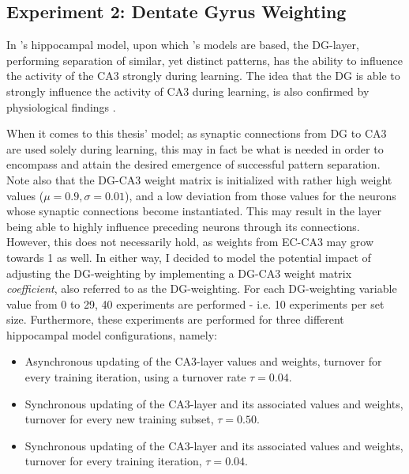 \subsection{Experiment 2: Dentate Gyrus Weighting}

In \citeauthor{Wakagi2008}'s \citeyear{Wakagi2008} hippocampal model, upon which \citeauthor{Hattori2010}'s \citeyear{Hattori2010, Hattori2014} models are based, the DG-layer, performing separation of similar, yet distinct patterns, has the ability to influence the activity of the CA3 strongly during learning. The idea that the DG is able to strongly influence the activity of CA3 during learning, is also confirmed by physiological findings \citep{Rolls1998chpt6}. 

When it comes to this thesis' model; as synaptic connections from DG to CA3 are used solely during learning, this may in fact be what is needed in order to encompass and attain the desired emergence of successful pattern separation. Note also that the DG-CA3 weight matrix is initialized with rather high weight values ($\mu=0.9, \sigma=0.01$), and a low deviation from those values for the neurons whose synaptic connections become instantiated. This may result in the layer being able to highly influence preceding neurons through its connections. However, this does not necessarily hold, as weights from EC-CA3 may grow towards 1 as well. In either way, I decided to model the potential impact of adjusting the DG-weighting by implementing a DG-CA3 weight matrix \textit{coefficient}, also referred to as the DG-weighting. For each DG-weighting variable value from 0 to 29, 40 experiments are performed - i.e. 10 experiments per set size. Furthermore, these experiments are performed for three different hippocampal model configurations, namely:

\begin{itemize}  
\item Asynchronous updating of the CA3-layer values and weights, turnover for every training iteration, using a turnover rate $\tau=0.04$.
\item Synchronous updating of the CA3-layer and its associated values and weights, turnover for every new training subset, $\tau=0.50$.
\item Synchronous updating of the CA3-layer and its associated values and weights, turnover for every training iteration, $\tau=0.04$.
\end{itemize}

